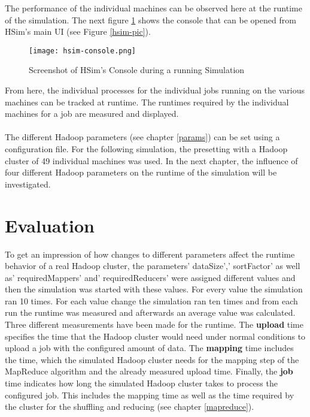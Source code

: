 The performance of the individual machines can be observed here at the runtime of the simulation. The next figure \ref{hsim-console} shows the console that can be opened from HSim's main UI (see Figure \ref{hsim-pic}).
\begin{figure}[H]
	\centering
	\texttt{[image: hsim-console.png]}
	\caption[Caption for LOF]{Screenshot of HSim's Console during a running Simulation}
	\label{hsim-console}
\end{figure}
From here, the individual processes for the individual jobs running on the various machines can be tracked at runtime. The runtimes required by the individual machines for a job are measured and displayed.
\\\\
The different Hadoop parameters (see chapter \ref{params}) can be set using a configuration file. For the following simulation, the presetting with a Hadoop cluster of 49 individual machines was used. In the next chapter, the influence of four different Hadoop parameters on the runtime of the simulation will be investigated.
\chapter{Evaluation}
\label{eval}
To get an impression of how changes to different parameters affect the runtime behavior of a real Hadoop cluster, the parameters' dataSize',' sortFactor' as well as' requiredMappers' and' requiredReducers' were assigned different values and then the simulation was started with these values. For every value the simulation ran 10 times. For each value change the simulation ran ten times and from each run the runtime was measured and afterwards an average value was calculated.
\\
Three different measurements have been made for the runtime. The \textbf{upload} time specifies the time that the Hadoop cluster would need under normal conditions to upload a job with the configured amount of data. The \textbf{mapping} time includes the time, which the simulated Hadoop cluster needs for the mapping step of the MapReduce algorithm and the already measured upload time. Finally, the \textbf{job} time indicates how long the simulated Hadoop cluster takes to process the configured job. This includes the mapping time as well as the time required by the cluster for the shuffling and reducing (see chapter \ref{mapreduce}).
